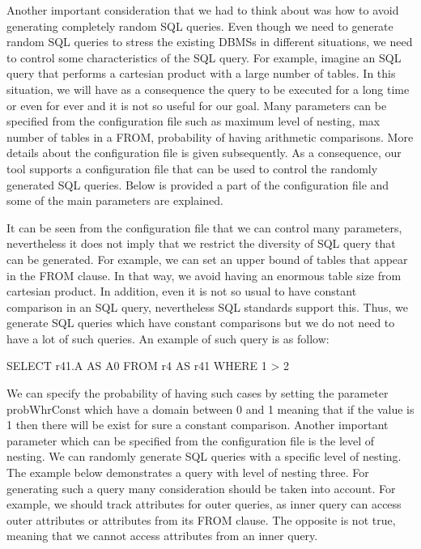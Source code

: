Another important consideration that we had to think about was how to avoid generating completely random SQL queries. Even though we need to generate random SQL queries to stress the existing DBMSs in different situations, we need to control some characteristics of the SQL query. For example, imagine an SQL query that performs a cartesian product with a large number of tables. In this situation, we will have as a consequence the query to be executed for a long time or even for ever and it is not so useful for our goal. Many parameters can be specified from the configuration file such as maximum level of nesting, max number of tables in a FROM, probability of having arithmetic comparisons. More details about the configuration file is given subsequently. As a consequence, our tool supports a configuration file that can be used to control the randomly generated SQL queries. Below is provided a part of the configuration file and some of the main parameters are explained.     

It can be seen from the configuration file that we can control many parameters, nevertheless it does not imply that we restrict the diversity of SQL query that can be generated. For example, we can set an upper bound of tables that appear in the FROM clause. In that way, we avoid having an enormous table size from cartesian product. In addition, even it is not so usual to have constant comparison in an SQL query, nevertheless SQL standards support this. Thus, we generate SQL queries which have constant comparisons but we do not need to have a lot of such queries. An example of such query is as follow:

SELECT r41.A AS A0
FROM r4 AS r41
WHERE 1 > 2

We can specify the probability of having such cases by setting the parameter probWhrConst which have a domain between 0 and 1 meaning that if the value is 1 then there will be exist for sure a constant comparison.
	Another important parameter which can be specified from the configuration file is the level of nesting. We can randomly generate SQL queries with a specific level of nesting. The example below demonstrates a query with level of nesting three. For generating such a query many consideration should be taken into account. For example, we should track attributes for outer queries, as inner query can access outer attributes or attributes from its FROM clause. The opposite is not true, meaning that we cannot access attributes from an inner query. 





